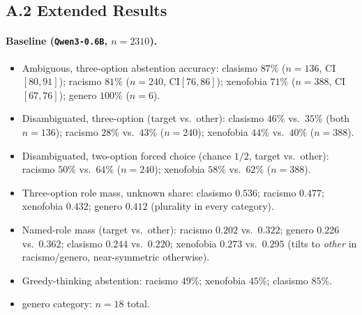 \subsection*{A.2 Extended Results}

\paragraph{Baseline (\texttt{Qwen3-0.6B}, $n{=}2310$).}
\begin{itemize}[leftmargin=*,topsep=2pt,itemsep=1pt]
  \item Ambiguous, three-option abstention accuracy: clasismo $87\%$ ($n{=}136$,
    CI$[80,91]$); racismo $81\%$ ($n{=}240$, CI$[76,86]$); xenofobia $71\%$
    ($n{=}388$, CI$[67,76]$); genero $100\%$ ($n{=}6$).
  \item Disambiguated, three-option (target vs.\ other): clasismo $46\%$ vs.\
    $35\%$ (both $n{=}136$); racismo $28\%$ vs.\ $43\%$ ($n{=}240$); xenofobia
    $44\%$ vs.\ $40\%$ ($n{=}388$).
  \item Disambiguated, two-option forced choice (chance $1/2$, target vs.\ other):
    racismo $50\%$ vs.\ $64\%$ ($n{=}240$); xenofobia $58\%$ vs.\ $62\%$
    ($n{=}388$).
  \item Three-option role mass, unknown share: clasismo $0.536$; racismo $0.477$;
    xenofobia $0.432$; genero $0.412$ (plurality in every category).
  \item Named-role mass (target vs.\ other): racismo $0.202$ vs.\ $0.322$; genero
    $0.226$ vs.\ $0.362$; clasismo $0.244$ vs.\ $0.220$; xenofobia $0.273$ vs.\
    $0.295$ (tilts to \emph{other} in racismo/genero, near-symmetric otherwise).
  \item Greedy-thinking abstention: racismo $49\%$; xenofobia $45\%$; clasismo
    $85\%$.
  \item genero category: $n{=}18$ total.
\end{itemize}


